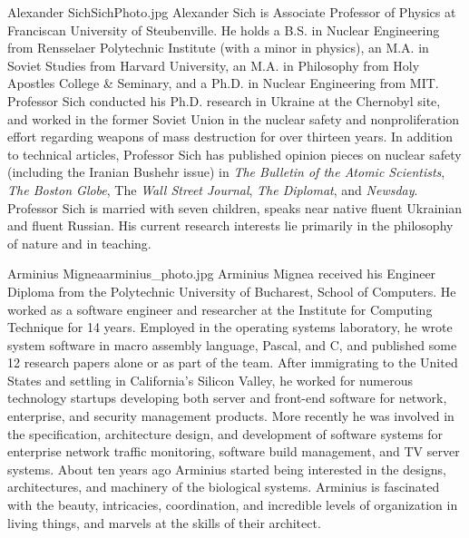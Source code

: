 
\begin{authorbio}{Alexander Sich}{SichPhoto.jpg}{}
Alexander Sich is Associate Professor of Physics at Franciscan University of Steubenville. He holds a B.S. in Nuclear Engineering from Rensselaer Polytechnic Institute (with a minor in physics), an M.A. in Soviet Studies from Harvard University, an M.A. in Philosophy from Holy Apostles College \& Seminary, and a Ph.D. in Nuclear Engineering from MIT.  Professor Sich conducted his Ph.D. research in Ukraine at the Chernobyl site, and worked in the former Soviet Union in the nuclear safety and nonproliferation effort regarding weapons of mass destruction for over thirteen years. In addition to technical articles, Professor Sich has published opinion pieces on nuclear safety (including the Iranian Bushehr issue) in \emph{The Bulletin of the Atomic Scientists}, \emph{The Boston Globe}, The \emph{Wall Street Journal}, \emph{The Diplomat}, and \emph{Newsday}. Professor Sich is married with seven children, speaks near native fluent Ukrainian and fluent Russian. His current research interests lie primarily in the philosophy of nature and in teaching.
\end{authorbio}

\begin{authorbio}{Arminius Mignea}{arminius_photo.jpg}{}
Arminius Mignea received his Engineer Diploma from the Polytechnic University of Bucharest, School of Computers. He worked as a software engineer and researcher at the Institute for Computing Technique for 14 years. Employed in the operating systems laboratory, he wrote system software in macro assembly language, Pascal, and C, and published some 12 research papers alone or as part of the team. After immigrating to the United States and settling in California's Silicon Valley, he worked for numerous technology startups developing both server and front-end software for network, enterprise, and security management products. More recently he was involved in the specification, architecture design, and development of software systems for enterprise network traffic monitoring, software build management, and TV server systems. About ten years ago Arminius started being interested in the designs, architectures, and machinery of the biological systems. Arminius is fascinated with the beauty, intricacies, coordination, and incredible levels of organization in living things, and marvels at the skills of their architect.
\end{authorbio}

